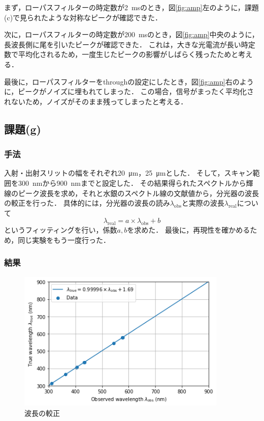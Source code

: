 \documentclass[titlepage]{jsarticle}
\begin{document}
まず，ローパスフィルターの時定数が\SI{2}{\ms}のとき，図\ref{fig:amp}左のように，課題(c)で見られたような対称なピークが確認できた．

次に，ローパスフィルターの時定数が\SI{200}{\ms}のとき，図\ref{fig:amp}中央のように，長波長側に尾を引いたピークが確認できた．
これは，大きな光電流が長い時定数で平均化されるため，一度生じたピークの影響がしばらく残ったためと考える．

最後に，ローパスフィルターをthroughの設定にしたとき，図\ref{fig:amp}右のように，ピークがノイズに埋もれてしまった．
この場合，信号がまったく平均化されないため，ノイズがそのまま残ってしまったと考える．

\subsection{課題(g)}
\subsubsection{手法}
入射・出射スリットの幅をそれぞれ\SI{20}{\um}，\SI{25}{\um}とした．
そして，スキャン範囲を\SI{300}{\nm}から\SI{900}{\nm}までと設定した．
その結果得られたスペクトルから輝線のピーク波長を求め，それと水銀のスペクトル線の文献値から，分光器の波長の較正を行った．
具体的には，分光器の波長の読み$\lambda_{\mathrm{obs}}$と実際の波長$\lambda_{\mathrm{real}}$について
\begin{equation}
  \lambda_{\mathrm{real}} = a \times \lambda_{\mathrm{obs}} + b
\end{equation}
というフィッティングを行い，係数$a,b$を求めた．
最後に，再現性を確かめるため，同じ実験をもう一度行った．

\subsubsection{結果}

\begin{figure}[htbp]
  \centering
  \includegraphics[width=10cm]{lambda_calib.png}
  \caption{波長の較正}
  \label{fig:lambda_calib}
\end{figure}
\end{document}
